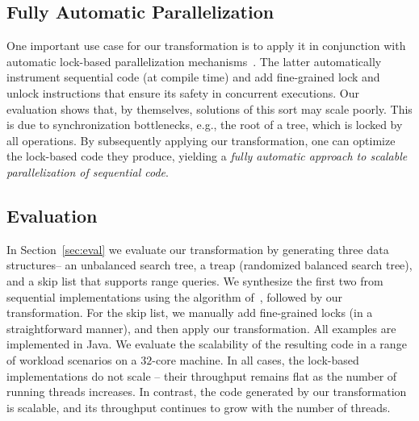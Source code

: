 \subsection{Fully Automatic Parallelization}
One important use case for our transformation is to apply it in conjunction with automatic lock-based
parallelization mechanisms~\cite{Gueta2011,MZGB:POPL06}.
The latter automatically instrument sequential code (at compile time)
and add fine-grained lock and unlock instructions that ensure its safety in concurrent executions.
Our evaluation shows that, by themselves, solutions of this sort may scale poorly.
This is due to synchronization bottlenecks, e.g., the root of a tree,
which is locked by all operations.
By subsequently applying our transformation, one can optimize
the lock-based code they produce, yielding a \emph{fully automatic approach to
scalable parallelization of sequential code}.


\subsection{Evaluation}
In Section~\ref{sec:eval} we evaluate our transformation by generating three data structures-- an unbalanced search tree, a treap
(randomized balanced search tree),
and a skip list that supports range queries. We synthesize the first two from sequential implementations using the algorithm of~\cite{Gueta2011}, followed by our transformation.
For the skip list, we manually add fine-grained locks (in a straightforward manner), and then apply our transformation.
All examples are implemented in Java. We evaluate the scalability of the resulting code
in a range of workload scenarios on a $32$-core machine.
In all cases, the lock-based implementations do not scale --
their throughput remains flat as the number of running threads increases. In contrast, the code generated by our transformation
is scalable, and its throughput continues to grow with the number of threads.

